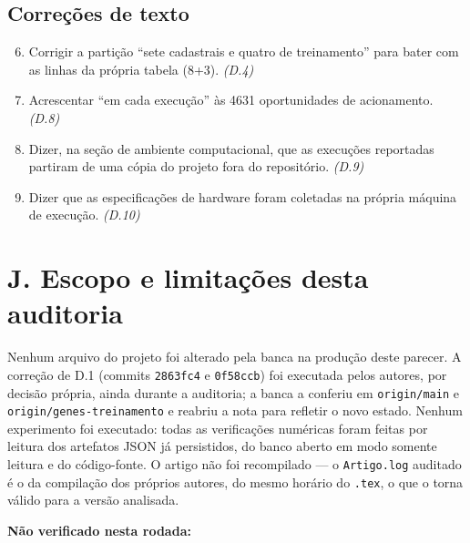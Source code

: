 \documentclass[11pt,a4paper]{article}
\begin{document}
\subsection*{Correções de texto}

\begin{enumerate}\setcounter{enumi}{5}
  \item Corrigir a partição ``sete cadastrais e quatro de treinamento'' para bater com as linhas da
  própria tabela (8+3). \emph{(D.4)}
  \item Acrescentar ``em cada execução'' às 4631 oportunidades de acionamento. \emph{(D.8)}
  \item Dizer, na seção de ambiente computacional, que as execuções reportadas partiram de uma cópia
  do projeto fora do repositório. \emph{(D.9)}
  \item Dizer que as especificações de hardware foram coletadas na própria máquina de execução.
  \emph{(D.10)}
\end{enumerate}

\section*{J. Escopo e limitações desta auditoria}

Nenhum arquivo do projeto foi alterado pela banca na produção deste parecer. A correção de D.1
(commits \texttt{2863fc4} e \texttt{0f58ccb}) foi executada pelos autores, por decisão própria, ainda
durante a auditoria; a banca a conferiu em \texttt{origin/main} e \texttt{origin/genes-treinamento} e
reabriu a nota para refletir o novo estado. Nenhum experimento foi executado:
todas as verificações numéricas foram feitas por leitura dos artefatos JSON já persistidos, do banco
aberto em modo somente leitura e do código-fonte. O artigo não foi recompilado --- o
\texttt{Artigo.log} auditado é o da compilação dos próprios autores, do mesmo horário do
\texttt{.tex}, o que o torna válido para a versão analisada.

\textbf{Não verificado nesta rodada:}
\end{document}
